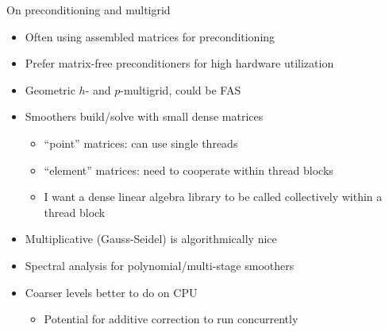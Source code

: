 \documentclass{beamer}
\begin{document}


%




\begin{frame}{On preconditioning and multigrid}
  \begin{itemize}
  \item Often using assembled matrices for preconditioning
  \item Prefer matrix-free preconditioners for high hardware utilization
  \item Geometric $h$- and $p$-multigrid, could be FAS
  \item Smoothers build/solve with small dense matrices
    \begin{itemize}
    \item ``point'' matrices: can use single threads
    \item ``element'' matrices: need to cooperate within thread blocks
    \item I want a dense linear algebra library to be called collectively within a thread block
    \end{itemize}
  \item Multiplicative (Gauss-Seidel) is algorithmically nice
  \item Spectral analysis for polynomial/multi-stage smoothers
  \item Coarser levels better to do on CPU
    \begin{itemize}
    \item Potential for additive correction to run concurrently
    \end{itemize}
  \end{itemize}
\end{frame}
\end{document}
